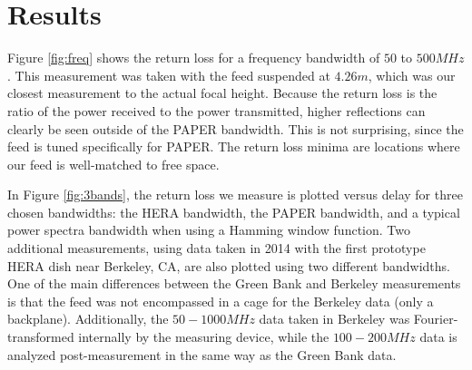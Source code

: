 \documentclass[12pt,preprint]{aastex}
\begin{document}
\section{Results}

Figure \ref{fig:freq} shows the return loss for a frequency bandwidth of $50$ to
$500MHz$. This measurement was taken with the feed suspended at $4.26m$, which
was our closest measurement to the actual focal height.  Because the return
loss is the ratio of the power received to the power transmitted, higher
reflections can clearly be seen outside of the PAPER bandwidth. This is not
surprising, since the feed is tuned specifically for PAPER. The return loss
minima are locations where our feed is well-matched to free space.

In Figure \ref{fig:3bands}, the return loss we measure is plotted versus delay
for three chosen bandwidths: the HERA bandwidth, the PAPER bandwidth, and a
typical power spectra bandwidth when using a Hamming window function. Two
additional measurements, using data taken in 2014 with the first prototype HERA
dish near Berkeley, CA, are also plotted using two different bandwidths. One of
the main differences between the Green Bank and Berkeley measurements is that
the feed was not encompassed in a cage for the Berkeley data (only a backplane). Additionally, the $50-1000MHz$ data taken in Berkeley was
Fourier-transformed internally by the measuring device, while the $100-200MHz$
data is analyzed post-measurement in the same way as the Green Bank data. 
\end{document}
